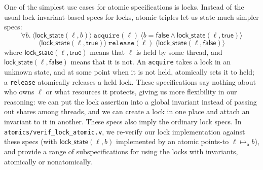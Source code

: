 \documentclass[11pt]{article}
\begin{document}
One of the simplest use cases for atomic specifications is locks. Instead of the usual lock-invariant-based specs for locks, atomic triples let us state much simpler specs:
\[\forall b.\ \langle \mathsf{lock\_state}(\ell, b)\rangle\ \texttt{acquire}(\ell)\ \langle b = \mathsf{false} \land \mathsf{lock\_state}(\ell, \mathsf{true})\rangle\]
\[\langle \mathsf{lock\_state}(\ell, \mathsf{true})\rangle\ \texttt{release}(\ell)\ \langle \mathsf{lock\_state}(\ell, \mathsf{false})\rangle\]
where $\mathsf{lock\_state}(\ell, \mathsf{true})$ means that $\ell$ is held by some thread, and $\mathsf{lock\_state}(\ell, \mathsf{false})$ means that it is not. An \texttt{acquire} takes a lock in an unknown state, and at some point when it is not held, atomically sets it to held; a \texttt{release} atomically releases a held lock. These specifications say nothing about who owns $\ell$ or what resources it protects, giving us more flexibility in our reasoning: we can put the lock assertion into a global invariant instead of passing out shares among threads, and we can create a lock in one place and attach an invariant to it in another. These specs also imply the ordinary lock specs. In \texttt{atomics/verif\_lock\_atomic.v}, we re-verify our lock implementation against these specs (with $\mathsf{lock\_state}(\ell, b)$ implemented by an atomic points-to $\ell \mapsto_{\mathrm{a}} b$), and provide a range of subspecifications for using the locks with invariants, atomically or nonatomically.
\end{document}
